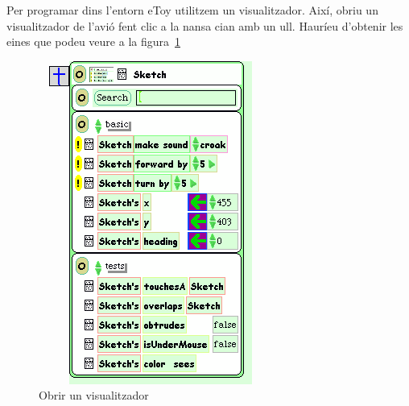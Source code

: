 Per programar dins l'entorn eToy utilitzem un visualitzador. Així, obriu un visualitzador de l'avió fent clic a la nansa cian amb un ull. Hauríeu d'obtenir les eines que podeu veure a la figura~\ref{fig2404} 
\begin{figure}[h!]
\begin{center}
\includegraphics[scale=0.35]{Imatges/figura24-4}
\end{center}
\caption{Obrir un visualitzador}
\label{fig2404}
\end{figure}

